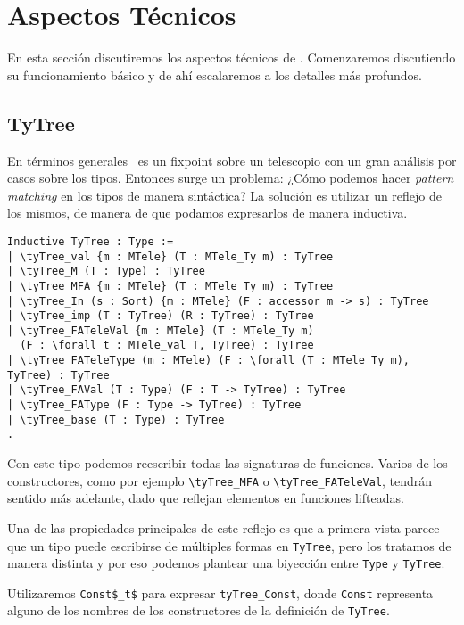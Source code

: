 \section{Aspectos Técnicos}

En esta sección discutiremos los aspectos técnicos de \lift.
Comenzaremos discutiendo su funcionamiento básico y de ahí escalaremos a los detalles más profundos. 

\subsection{TyTree}

En términos generales \lift\ es un fixpoint sobre un telescopio con un gran análisis por casos sobre los tipos.
Entonces surge un problema: ¿Cómo podemos hacer \textit{pattern matching} en los tipos de manera sintáctica?
La solución es utilizar un reflejo de los mismos, de manera de que podamos expresarlos de manera inductiva.

\begin{lstlisting}
Inductive TyTree : Type :=
| \tyTree_val {m : MTele} (T : MTele_Ty m) : TyTree
| \tyTree_M (T : Type) : TyTree
| \tyTree_MFA {m : MTele} (T : MTele_Ty m) : TyTree
| \tyTree_In (s : Sort) {m : MTele} (F : accessor m -> s) : TyTree
| \tyTree_imp (T : TyTree) (R : TyTree) : TyTree
| \tyTree_FATeleVal {m : MTele} (T : MTele_Ty m)
  (F : \forall t : MTele_val T, TyTree) : TyTree
| \tyTree_FATeleType (m : MTele) (F : \forall (T : MTele_Ty m), TyTree) : TyTree
| \tyTree_FAVal (T : Type) (F : T -> TyTree) : TyTree
| \tyTree_FAType (F : Type -> TyTree) : TyTree
| \tyTree_base (T : Type) : TyTree
.
\end{lstlisting}

Con este tipo podemos reescribir todas las signaturas de funciones. Varios de los constructores, como por ejemplo
\lstinline{\tyTree_MFA} o \lstinline{\tyTree_FATeleVal}, tendrán sentido más adelante, dado que reflejan elementos en
funciones lifteadas.

Una de las propiedades principales de este reflejo es que a primera vista parece que un tipo puede escribirse de múltiples formas en \lstinline{TyTree}, pero los tratamos de manera distinta y por eso podemos plantear una biyección
entre \lstinline{Type} y \lstinline{TyTree}.

Utilizaremos \lstinline{Const$_t$} para expresar \lstinline{tyTree_Const}, donde \lstinline{Const} representa alguno de los nombres de los constructores de la definición de \lstinline{TyTree}. 

